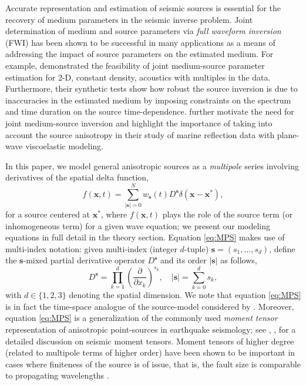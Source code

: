 
Accurate representation and estimation of seismic sources is essential for the recovery of medium parameters in the seismic inverse problem.
Joint determination of medium and source parameters via \emph{full waveform inversion} (FWI) has been shown to be successful in many applications as a means of addressing the impact of source parameters on the estimated medium. 
For example, \cite{Wang:09} demonstrated the feasibility of joint medium-source parameter estimation for 2-D, constant density, acoustics with multiples in the data. 
Furthermore, their synthetic tests show how robust the source inversion is due to inaccuracies in the estimated medium by imposing constraints on the spectrum and time duration on the source time-dependence.
\cite{SymMink:97} further motivate the need for joint medium-source inversion and highlight the importance of taking into account the source anisotropy in their study of marine reflection data with plane-wave viscoelastic modeling.

In this paper, we model general anisotropic sources as a \emph{multipole} series involving derivatives of the spatial delta function,
\begin{equation}\label{eq:MPS}
	f(\mathbf x,t) = \sum_{|\mathbf s|=0}^N w_{\mathbf s}(t) D^{\mathbf s} \delta(\mathbf x-\mathbf x^*),
\end{equation}
for a source centered at $\mathbf x^*$, where $f(\mathbf x,t)$ plays the role of the source term (or inhomogeneous term) for a given wave equation; we present our modeling equations in full detail in the theory section.
Equation \ref{eq:MPS} makes use of multi-index notation:
given multi-index (integer $d$-tuple) $\mathbf s=(s_1,...,s_d)$, define the $\mathbf s$-mixed partial derivative operator $D^{\mathbf s}$ and its order $|\mathbf s|$ as follows,
\[
	D^{\mathbf s} = \prod_{k=1}^d \left(\frac{\partial}{\partial x_k}\right)^{s_k},
         \quad |\mathbf s| = \sum_{k=0}^d s_k,
\]
with $d\in\{1,2,3\}$ denoting the spatial dimension. 
We note that equation \ref{eq:MPS} is in fact the time-space analogue of the source-model considered by \cite{SymMink:97}.
Moreover, equation \ref{eq:MPS} is a generalization of the commonly used \emph{moment tensor} representation of anisotropic point-sources in earthquake seismology; see \cite{AkiRich:80}, \cite{Backus:1976a}, \cite{Shearer:2009} for a detailed discussion on seismic moment tensors.
Moment tensors of higher degree (related to multipole terms of higher order) have been shown to be important in cases where finiteness of the source is of issue, that is, the fault size is comparable to propagating wavelengths \citep{Stump:1982}.

